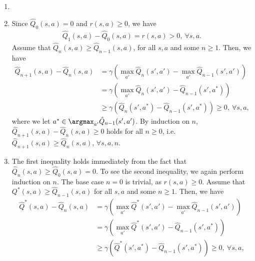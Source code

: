 \begin{exercise}
\begin{enumerate}
            \begin{solution}
                \begin{enumerate}
                    \item []
                    \item Since $\hat{Q}_{0}(s,a) = 0$ and $r(s,a)\ge 0$, we have
                        \begin{align*}
                            \hat{Q}_{1}(s,a) - \hat{Q}_{0}(s,a) = r(s,a) > 0,\ \forall s,a.
                        \end{align*}
                        Assume that $\hat{Q}_{n}(s,a) \ge \hat{Q}_{n-1}(s,a)$, for all $s,a$ and some $n\ge 1$. Then, we have
                        \begin{align*}
                            \hat{Q}_{n+1}(s,a) - \hat{Q}_n(s,a)
                             & = \gamma \left(\max_{a'}\hat{Q}_n(s', a') - \max_{a'}\hat{Q}_{n-1}(s', a')\right)        \\
                             & = \gamma \left(\max_{a'}\hat{Q}_n(s', a') - \hat{Q}_{n-1}(s', a^*)\right)                \\
                             & \ge \gamma \left(\hat{Q}_n(s', a^*) - \hat{Q}_{n-1}(s', a^*)\right) \ge 0,\ \forall s,a,
                        \end{align*}
                        where we let $a^* \in \argmax_{a'} \hat{Q}_{n-1}(s', a')$.
                        By induction on $n$, $\hat{Q}_{n+1}(s,a) - \hat{Q}_n(s,a) \ge 0$ holds for all $n\ge 0$, i.e. $\hat{Q}_{n+1}(s,a) \ge \hat{Q}_n(s,a)$, $\forall s,a,n$.
                    \item
                        The first inequality holds immediately from the fact that $\hat{Q}_{n}(s,a) \ge \hat{Q}_0(s,a) = 0$. To see the second inequality, we again perform induction on $n$. The base case $n=0$ is trivial, as $r(s,a) \ge 0$. Assume that $Q^*(s,a) \ge \hat{Q}_{n-1}(s,a)$ for all $s,a$ and some $n\ge 1$. Then, we have
                        \begin{align*}
                            \hat{Q}^*(s,a) - \hat{Q}_n(s,a)
                             & = \gamma \left(\max_{a'}\hat{Q}^*(s', a') - \max_{a'}\hat{Q}_{n-1}(s', a')\right)        \\
                             & = \gamma \left(\max_{a'}\hat{Q}^*(s', a') - \hat{Q}_{n-1}(s', a^*)\right)                \\
                             & \ge \gamma \left(\hat{Q}^*(s', a^*) - \hat{Q}_{n-1}(s', a^*)\right) \ge 0,\ \forall s,a,

\end{align*}
\end{enumerate}
\end{solution}
\end{enumerate}
\end{exercise}
